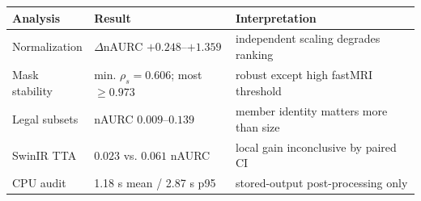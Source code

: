 \begin{tabular}{lll}
\toprule
Analysis & Result & Interpretation \\
\midrule
Normalization & $\Delta$nAURC $+0.248$--$+1.359$ & independent scaling degrades ranking \\
Mask stability & min. $\rho_s=0.606$; most $\geq0.973$ & robust except high fastMRI threshold \\
Legal subsets & nAURC $0.009$--$0.139$ & member identity matters more than size \\
SwinIR TTA & $0.023$ vs. $0.061$ nAURC & local gain inconclusive by paired CI \\
CPU audit & 1.18 s mean / 2.87 s p95 & stored-output post-processing only \\
\bottomrule
\end{tabular}
